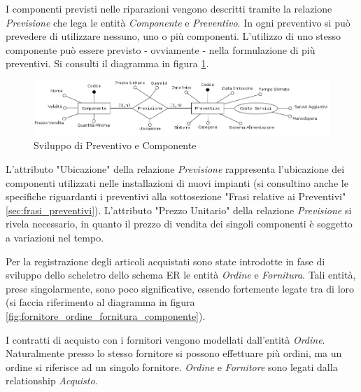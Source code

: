 			I componenti previsti nelle riparazioni vengono descritti tramite la relazione \emph{Previsione} che lega le entità \emph{Componente} e \emph{Preventivo}. In ogni preventivo si può prevedere di utilizzare nessuno, uno o più componenti. L'utilizzo di uno stesso componente può essere previsto - ovviamente - nella formulazione di più preventivi.
			Si consulti il diagramma in figura \ref{fig:preventivo_componente}.
			
			\begin{figure}[H]
				\centering
				\includegraphics[width=13cm]{images/finitures/preventivo_componente.png}
				\caption{Sviluppo di Preventivo e Componente}
				\label{fig:preventivo_componente}
			\end{figure}
			
			L'attributo "Ubicazione" della relazione \emph{Previsione} rappresenta l'ubicazione dei componenti utilizzati nelle installazioni di nuovi impianti (si consultino anche le specifiche riguardanti i preventivi alla sottosezione "Frasi relative ai Preventivi" \ref{sec:frasi_preventivi}).
			L'attributo "Prezzo Unitario" della relazione \emph{Previsione} si rivela necessario, in quanto il prezzo di vendita dei singoli componenti è soggetto a variazioni nel tempo.
			
			Per la registrazione degli articoli acquistati sono state introdotte in fase di sviluppo dello scheletro dello schema ER le entità \emph{Ordine} e \emph{Fornitura}. Tali entità, prese singolarmente, sono poco significative, essendo fortemente legate tra di loro (si faccia riferimento al diagramma in figura \ref{fig:fornitore_ordine_fornitura_componente}).
			
			I contratti di acquisto con i fornitori vengono modellati dall'entità \emph{Ordine}. Naturalmente presso lo stesso fornitore si possono effettuare più ordini, ma un ordine si riferisce ad un singolo fornitore. \emph{Ordine} e \emph{Fornitore} sono legati dalla relationship \emph{Acquisto}.
			
